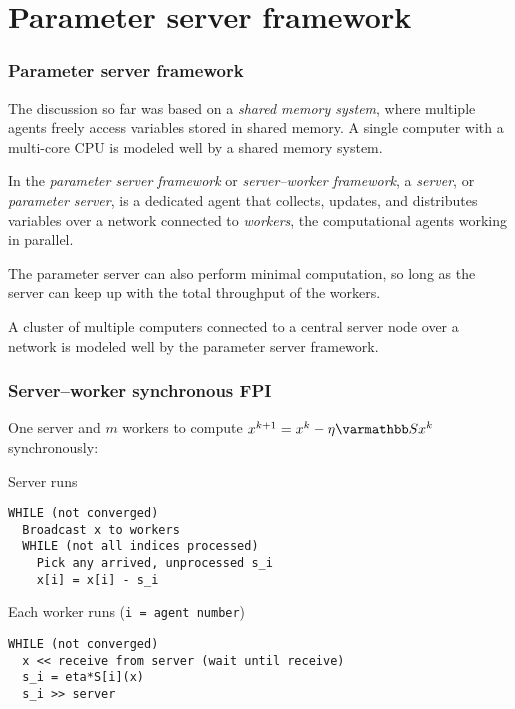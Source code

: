 \documentclass[10pt,mathserif]{beamer}
\begin{document}
\section{Parameter server framework}

\begin{frame}[fragile]
\frametitle{Parameter server framework}
The discussion so far was based on a \emph{shared memory system}, where multiple agents freely access variables stored in shared memory.
A single computer with a multi-core CPU is modeled well by a shared memory system. 
\medskip


In the \emph{parameter server framework} or \emph{server--worker framework}, a \emph{server}, or \emph{parameter server}, is a dedicated agent that collects, updates, and distributes variables over a network connected to \emph{workers}, the computational agents working in parallel.
\medskip

The parameter server can also perform minimal computation, so long as the server can keep up with the total throughput of the workers.
\medskip

A cluster of multiple computers connected to a central server node over a network is modeled well by the parameter server framework.

\end{frame}




\begin{frame}
\frametitle{Server--worker synchronous FPI}
One server and $m$ workers to compute $x^{k+1} = x^k - \eta \opS x^k$ synchronously:
\vspace{0.1in}

Server runs
\begin{lstlisting}
WHILE (not converged)
  Broadcast x to workers
  WHILE (not all indices processed)
    Pick any arrived, unprocessed s_i
    x[i] = x[i] - s_i
\end{lstlisting}
\vspace{0.1in}

Each worker runs (\verb|i = agent number|)
\begin{lstlisting}
WHILE (not converged)
  x << receive from server (wait until receive)
  s_i = eta*S[i](x)
  s_i >> server
\end{lstlisting}

\end{frame}
\end{document}
